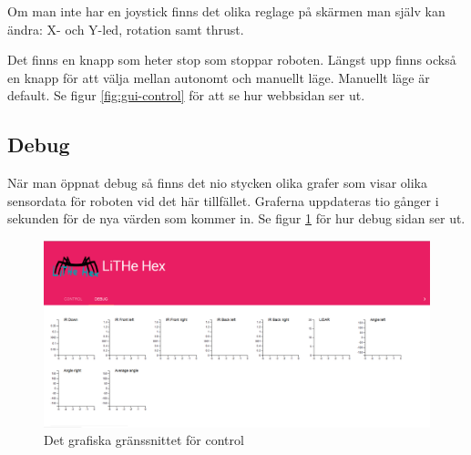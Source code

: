 \documentclass[a4paper,titlepage,12pt]{article}
\begin{document}
    Om man inte har en joystick finns det olika reglage på skärmen man själv kan
    ändra: X- och Y-led, rotation samt thrust.
	
	Det finns en knapp som heter stop som stoppar roboten. Längst upp finns
    också en knapp för att välja mellan autonomt och manuellt läge. Manuellt
    läge är default. Se figur \ref{fig:gui-control} för att se hur webbsidan ser
    ut.
	
	\subsection{Debug}\label{gui:debug}
	När man öppnat debug så finns det nio stycken olika grafer som visar olika
    sensordata för roboten vid det här tillfället. Graferna uppdateras tio
    gånger i sekunden för de nya värden som kommer in. Se figur
    \ref{fig:gui-debug} för hur debug sidan ser ut.
	
	\begin{figure}[h]
		\centering
		\includegraphics[width=0.5\linewidth]{images/gui-debug.png}
		\caption{Det grafiska gränssnittet för control\label{fig:gui-debug}}
	\end{figure}
	
\end{document}
